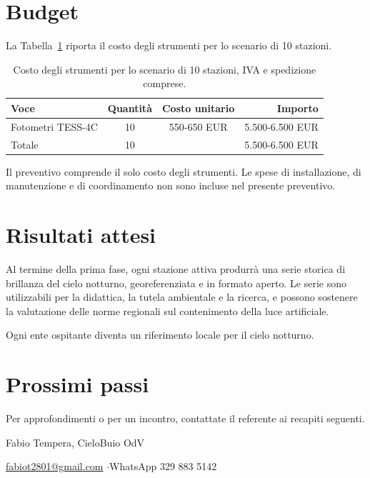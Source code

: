 \documentclass[11pt,a4paper]{report}
\begin{document}
\section*{Budget}

La Tabella~\ref{tab:budget} riporta il costo degli strumenti per lo scenario di 10 stazioni.

\begin{table}[ht!]

\centering
\renewcommand{\arraystretch}{1.5}

\begin{tabularx}{\linewidth}{@{}X c c r@{}}
\toprule
Voce & Quantità & Costo unitario & Importo \\
\midrule
Fotometri TESS-4C & 10 & 550-650 EUR & 5.500-6.500 EUR \\
\midrule
Totale & 10 & & 5.500-6.500 EUR \\
\bottomrule
\end{tabularx}

\caption{Costo degli strumenti per lo scenario di 10 stazioni, IVA e spedizione comprese.}
\label{tab:budget}
\end{table}

Il preventivo comprende il solo costo degli strumenti. Le spese di installazione, di manutenzione e di coordinamento non sono incluse nel presente preventivo.

\section*{Risultati attesi}

Al termine della prima fase, ogni stazione attiva produrrà una serie storica di brillanza del cielo notturno, georeferenziata e in formato aperto. Le serie sono utilizzabili per la didattica, la tutela ambientale e la ricerca, e possono sostenere la valutazione delle norme regionali sul contenimento della luce artificiale.

Ogni ente ospitante diventa un riferimento locale per il cielo notturno.

\section*{Prossimi passi}

Per approfondimenti o per un incontro, contattate il referente ai recapiti seguenti.

\vspace{0.2cm}

\noindent Fabio Tempera, CieloBuio OdV

\noindent \url{fabiot2801@gmail.com} \quad$\cdot$\quad WhatsApp 329 883 5142
\end{document}

